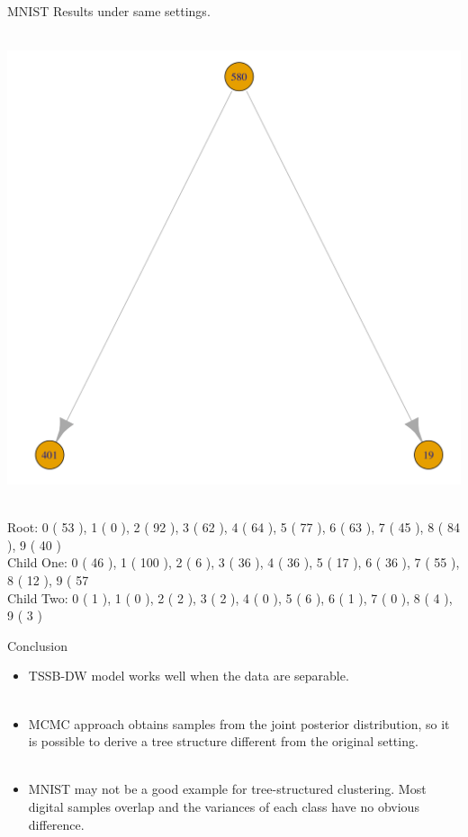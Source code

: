 \documentclass[10 pt]{beamer}
\begin{document}
\begin{frame}{MNIST}
	Results under same settings.\\
	~\\
	\centerline{\includegraphics[scale=0.15]{figs/mnistRes.png}}
	~\\
    Root: 0 ( 53 ), 1 ( 0 ), 2 ( 92 ), 3 ( 62 ), 4 ( 64 ), 5 ( 77 ), 6 ( 63 ), 7 ( 45 ), 8 ( 84 ), 9 ( 40 )\\
    
    Child One: 0 ( 46 ), 1 ( 100 ), 2 ( 6 ), 3 ( 36 ), 4 ( 36 ), 5 ( 17 ), 6 ( 36 ), 7 ( 55 ), 8 ( 12 ), 9 ( 57 \\
    
    Child Two: 0 ( 1 ), 1 ( 0 ), 2 ( 2 ), 3 ( 2 ), 4 ( 0 ), 5 ( 6 ), 6 ( 1 ), 7 ( 0 ), 8 ( 4 ), 9 ( 3 )
\end{frame}







\begin{frame}{Conclusion}
\begin{itemize}
	\item TSSB-DW model works well when the data are separable.
	~\\
	~\\
	\item MCMC approach obtains samples from the joint posterior distribution, so it is possible to derive a tree structure different from the original setting.
	~\\
	~\\
	\item MNIST may not be a good example for tree-structured clustering. Most digital samples overlap and the variances of each class have no obvious difference.
\end{itemize}
\end{frame}
\end{document}
